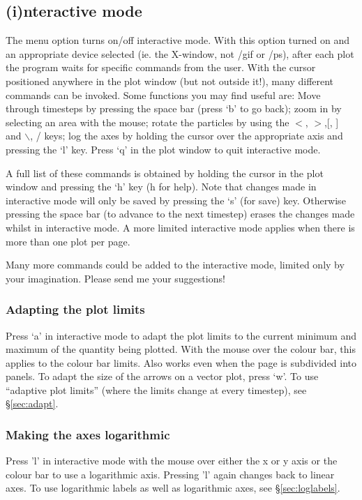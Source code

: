 \documentclass[a4paper,11pt]{article}
\begin{document}
\subsection{(i)nteractive mode}
\label{sec:interactive}
 The menu option turns on/off interactive mode. With this option turned on and
an appropriate device selected (ie. the X-window, not /gif or /ps), after
each plot the program waits for specific commands from the user. With the cursor
positioned anywhere in the plot window (but not outside it!), many different
commands can be invoked. Some functions you may find useful are: Move through timesteps by pressing the space bar (press
 `b' to go back); zoom in by selecting an area with the mouse; rotate the
particles by using the $<$, $>$,[, ] and $\backslash$, / keys; log the axes by holding the cursor
over the appropriate axis and pressing the `l' key. Press `q' in the plot window
to quit interactive mode.

 A full list of these commands is obtained by holding
the cursor in the plot window and pressing the `h' key (h for help). Note that changes made in interactive mode will only be saved by pressing the
`s' (for save) key. Otherwise pressing the space bar (to advance to the next
timestep) erases the changes made whilst in interactive mode. A more limited
interactive mode applies when there is more than one plot per page.

 Many more commands could be added to
the interactive mode, limited only by your imagination. Please send me your suggestions!

\subsubsection{ Adapting the plot limits}
 Press `a' in interactive mode to adapt the plot limits to the current minimum and maximum of the quantity being plotted. With the mouse over the colour bar, this applies to the colour bar limits. Also works even when the page is subdivided into panels. To adapt the size of the arrows on a vector plot, press `w'. To use ``adaptive plot limits'' (where the limits change at every timestep), see \S\ref{sec:adapt}.

\subsubsection{ Making the axes logarithmic}
 Press 'l' in interactive mode with the mouse over either the x or y axis or the colour bar to use a logarithmic axis. Pressing 'l' again changes back to linear axes. To use logarithmic labels as well as logarithmic axes, see \S\ref{sec:loglabels}.
\end{document}
